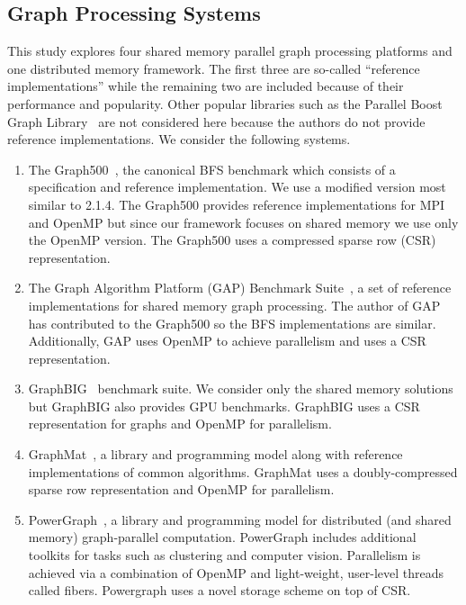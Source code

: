 \documentclass[conference]{IEEEtran}
\begin{document}
\subsection{Graph Processing Systems}

This study explores four shared memory parallel graph processing platforms and one distributed memory framework. The first three are so-called ``reference implementations'' while the remaining two are included because of their performance and popularity. Other popular libraries such as the Parallel Boost Graph Library~\cite{Gregor:2005:PBGL} are not considered here because the authors do not provide reference implementations. We consider the following systems.
\begin{enumerate}
	\item The Graph500~\cite{Murphy:2010:Graph500}, the canonical BFS benchmark which consists of a specification and reference implementation. We use a modified version most similar to 2.1.4. The Graph500 provides reference implementations for MPI and OpenMP but since our framework focuses on shared memory we use only the OpenMP version. The Graph500 uses a compressed sparse row (CSR) representation.
	\item The Graph Algorithm Platform (GAP) Benchmark Suite~\cite{Beamer:2015:GAPBench}, a set of reference implementations for shared memory graph processing. The author of GAP has contributed to the Graph500 so the BFS implementations are similar. Additionally, GAP uses OpenMP to achieve parallelism and uses a CSR representation.
	\item GraphBIG~\cite{Nai:2015:Graphbig} benchmark suite. We consider only the shared memory solutions but GraphBIG also provides GPU benchmarks. GraphBIG uses a CSR representation for graphs and OpenMP for parallelism.
	\item GraphMat~\cite{Sundaram:2015:GraphMat}, a library and programming model along with reference implementations of common algorithms. GraphMat uses a doubly-compressed sparse row representation and OpenMP for parallelism.
	\item PowerGraph~\cite{Gonzalez:2012:Powergraph}, a library and programming model for distributed (and shared memory) graph-parallel computation. PowerGraph includes additional toolkits for tasks such as clustering and computer vision. Parallelism is achieved via a combination of OpenMP and light-weight, user-level threads called fibers. Powergraph uses a novel storage scheme on top of CSR.
\end{enumerate}
\end{document}
